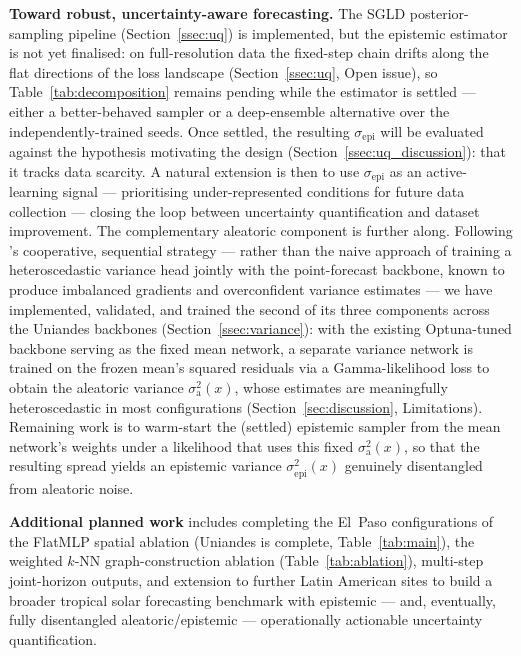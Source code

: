 \textbf{Toward robust, uncertainty-aware forecasting.} The SGLD
posterior-sampling pipeline (Section~\ref{ssec:uq}) is implemented, but the
epistemic estimator is not yet finalised: on full-resolution data the
fixed-step chain drifts along the flat directions of the loss landscape
(Section~\ref{ssec:uq}, Open issue), so Table~\ref{tab:decomposition}
remains pending while the estimator is settled --- either a better-behaved
sampler or a deep-ensemble alternative over the independently-trained
seeds. Once settled, the resulting $\sigma_\text{epi}$ will be evaluated
against the hypothesis motivating the design
(Section~\ref{ssec:uq_discussion}): that it tracks data scarcity. A natural
extension is then to use $\sigma_\text{epi}$ as an active-learning signal
--- prioritising under-represented conditions for future data collection ---
closing the loop between uncertainty quantification and dataset improvement.
The complementary aleatoric component is further along. Following
\citet{yi2025cooperative}'s cooperative, sequential strategy --- rather than
the naive approach of training a heteroscedastic variance head jointly with
the point-forecast backbone, known to produce imbalanced gradients and
overconfident variance estimates --- we have implemented, validated, and
trained the second of its three components across the Uniandes backbones
(Section~\ref{ssec:variance}): with the existing Optuna-tuned backbone
serving as the fixed mean network, a separate variance network is trained on
the frozen mean's squared residuals via a Gamma-likelihood loss to obtain
the aleatoric variance $\sigma^2_\text{a}(x)$, whose estimates are
meaningfully heteroscedastic in most configurations
(Section~\ref{sec:discussion}, Limitations). Remaining work is to
warm-start the (settled) epistemic sampler from the mean network's weights
under a likelihood that uses this fixed $\sigma^2_\text{a}(x)$, so that the
resulting spread yields an epistemic variance $\sigma^2_\text{epi}(x)$
genuinely disentangled from aleatoric noise.

\textbf{Additional planned work} includes completing the El~Paso
configurations of the FlatMLP spatial ablation (Uniandes is complete,
Table~\ref{tab:main}), the weighted $k$-NN graph-construction ablation
(Table~\ref{tab:ablation}), multi-step joint-horizon outputs, and extension
to further Latin American sites to build a broader tropical solar
forecasting benchmark with epistemic --- and, eventually, fully disentangled
aleatoric/epistemic --- operationally actionable uncertainty quantification.
